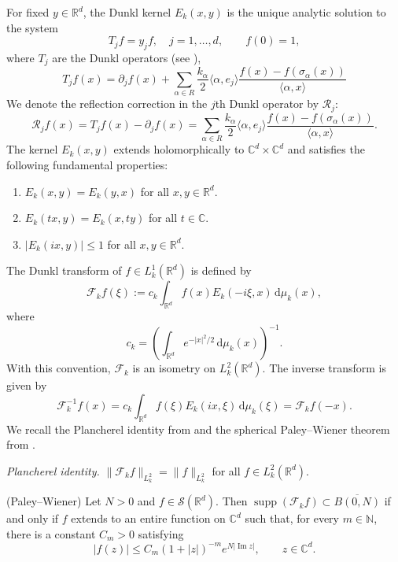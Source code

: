 \documentclass[12pt]{article}
\DeclareMathOperator{\supp}{supp}
\begin{document}
For fixed $y\in\mathbb{R}^d$, the Dunkl kernel $E_k(x,y)$ is the unique analytic solution to the system
\[
T_j f = y_j f,\quad j=1,\dots,d,\qquad f(0)=1,
\]
where $T_j$ are the Dunkl operators (see \cite{CFD1}),
\begin{equation}\label{ETJ}
T_jf(x)=\partial_j f(x)+\sum_{\alpha \in R}\frac{k_\alpha}{2}\langle \alpha,e_j\rangle \frac{f(x)-f(\sigma_\alpha(x))}{\langle \alpha,x\rangle}
\end{equation}
We denote the reflection correction in the $j$th Dunkl operator by $\mathcal{R}_j$:
\begin{equation}\label{ERH2}
\mathcal{R}_jf(x)=T_jf(x)-\partial_j f(x)=\sum_{\alpha \in R}\frac{k_\alpha}{2}\langle \alpha,e_j\rangle \frac{f(x)-f(\sigma_\alpha(x))}{\langle \alpha,x\rangle}.
\end{equation}
 The kernel $E_k(x,y)$ extends holomorphically to $\mathbb{C}^d \times \mathbb{C}^d$ and satisfies the following fundamental properties:
\begin{enumerate}
\item[(i)] $E_k(x,y) = E_k(y,x)$ for all $x,y \in \mathbb{R}^d$.
\item[(ii)] $E_k(tx,y) = E_k(x,ty)$ for all $t \in \mathbb{C}$.
\item[(iii)] $|E_k(ix,y)| \leq 1$ for all $x,y \in \mathbb{R}^d$.

\end{enumerate}

The Dunkl transform of $f \in L_k^1(\mathbb{R}^d)$ is defined by
\[
\mathcal{F}_k f(\xi) := c_k \int_{\mathbb{R}^d} f(x) E_k(-i\xi, x) \, \mathrm{d}\mu_k(x),
\]
where
\[
c_k=\left(\int_{\mathbb{R}^d}e^{-|x|^2/2}\,\mathrm{d}\mu_k(x)\right)^{-1}.
\]
With this convention, $\mathcal{F}_k$ is an isometry on $L_k^2(\mathbb{R}^d)$. The inverse transform is given by
\[
\mathcal{F}_k^{-1} f(x) = c_k \int_{\mathbb{R}^d} f(\xi) E_k(i x, \xi) \, \mathrm{d}\mu_k(\xi) = \mathcal{F}_k f(-x).
\]
We recall the Plancherel identity from \cite{MFE1} and the spherical Paley--Wiener theorem from \cite[Theorem~4.10]{MFE2}.

 \emph{Plancherel identity.} $\| \mathcal{F}_k f \|_{L_k^2} = \| f \|_{L_k^2}$ for all $f \in L_k^2(\mathbb{R}^d)$.
\begin{lemma}\label{PWSDK}
(Paley--Wiener) Let $N>0$ and $f\in\mathcal{S}(\mathbb{R}^d)$. Then $\supp(\mathcal{F}_k f)\subset\overline{B(0,N)}$ if and only if $f$ extends to an entire function on $\mathbb{C}^d$ such that, for every $m\in\mathbb{N}$, there is a constant $C_m>0$ satisfying
\[
|f(z)|\le C_m(1+|z|)^{-m}e^{N|\operatorname{Im}z|},\qquad z\in\mathbb{C}^d.
\]
\end{lemma}
\end{document}
